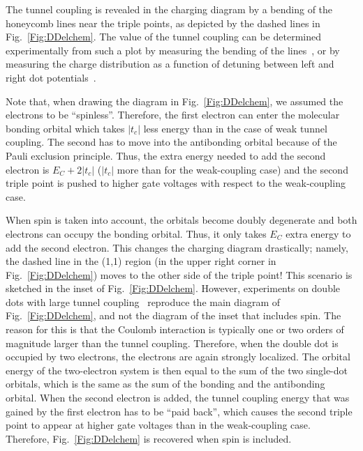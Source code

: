 \documentclass[rmp,twocolumn,aps]{revtex4}
\begin{document}
The tunnel coupling is revealed in the charging diagram by a bending of
the honeycomb lines near the triple points, as depicted by the
dashed lines in Fig.~\ref{Fig:DDelchem}. The value of the tunnel
coupling can be determined experimentally from such a plot
by measuring the bending of the
lines~\cite{PioroPRB2005,HuttelPRB2005}, or by measuring the
charge distribution as a function of detuning between left and
right dot potentials~\cite{DiCarlo_sensing,PettaPRL2004}.

Note that, when drawing the diagram in Fig.~\ref{Fig:DDelchem}, we
assumed the electrons to be ``spinless''. Therefore, the first
electron can enter the molecular bonding orbital which takes $\left| t_c \right|$ less energy than in the case of weak tunnel coupling. The
second has to move into the antibonding orbital because of the Pauli exclusion principle. Thus, the extra energy needed to add the second electron is $E_C+2\left| t_c \right|$ ($\left| t_c \right|$ more than for the weak-coupling case) and the second triple point is pushed to higher gate voltages with respect to the weak-coupling case.

When spin is taken into account, the orbitals become doubly degenerate and both electrons can
occupy the bonding orbital. Thus, it only takes $E_C$ extra energy to add the second electron. This changes the charging diagram
drastically; namely, the dashed line in the (1,1) region (in the upper right corner in Fig.~\ref{Fig:DDelchem}) moves to the other side of the triple point! This scenario is sketched in the inset of Fig.~\ref{Fig:DDelchem}.
However, experiments on double dots with large tunnel coupling~\cite{PioroPRB2005,HuttelPRB2005} reproduce
the main diagram of Fig.~\ref{Fig:DDelchem}, and not the diagram of the inset that includes spin.
The reason for this is that the Coulomb interaction is typically
one or two orders of magnitude larger than the tunnel coupling.
Therefore, when the double dot is occupied by two electrons, the
electrons are again strongly localized. The orbital energy of the
two-electron system is then equal to the sum of the two single-dot
orbitals, which is the same as the sum of the bonding and the
antibonding orbital. When the second electron is added, the tunnel coupling energy that was gained by the first electron has to be ``paid back'', which causes the second triple point to appear at higher gate voltages than in the weak-coupling case. Therefore, Fig.~\ref{Fig:DDelchem} is
recovered when spin is included.
\end{document}
